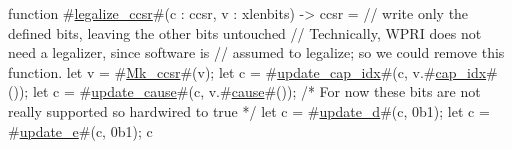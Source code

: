 function #\hyperref[sailRISCVzlegalizzezyccsr]{legalize\_ccsr}#(c : ccsr, v : xlenbits) -> ccsr = {
  // write only the defined bits, leaving the other bits untouched
  // Technically, WPRI does not need a legalizer, since software is
  // assumed to legalize; so we could remove this function.
  let v = #\hyperref[sailRISCVzMkzyccsr]{Mk\_ccsr}#(v);
  let c = #\hyperref[sailRISCVzupdatezycapzyidx]{update\_cap\_idx}#(c, v.#\hyperref[sailRISCVzcapzyidx]{cap\_idx}#());
  let c = #\hyperref[sailRISCVzupdatezycause]{update\_cause}#(c, v.#\hyperref[sailRISCVzcause]{cause}#());
  /* For now these bits are not really supported so hardwired to true */
  let c = #\hyperref[sailRISCVzupdatezyd]{update\_d}#(c, 0b1);
  let c = #\hyperref[sailRISCVzupdatezye]{update\_e}#(c, 0b1);
  c
}
